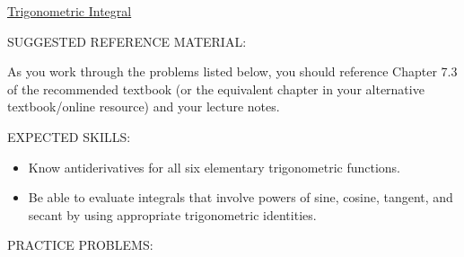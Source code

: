 \documentclass[12pt]{article}
\begin{document}
\begin{center}
\underline{\LARGE{Trigonometric Integral}}
\end{center}

\noindent SUGGESTED REFERENCE MATERIAL:

\bigskip

\noindent As you work through the problems listed below, you should reference Chapter 7.3 of the recommended textbook (or the equivalent chapter in your alternative textbook/online resource) and your lecture notes.

\bigskip

\noindent EXPECTED SKILLS:

\begin{itemize}

\item Know antiderivatives for all six elementary trigonometric functions. 

\item Be able to evaluate integrals that involve powers of sine, cosine, tangent, and secant by using appropriate trigonometric identities.

\end{itemize}

\noindent PRACTICE PROBLEMS:

\medskip
\end{document}
